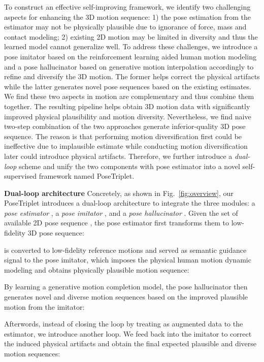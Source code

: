 \documentclass[10pt,twocolumn,letterpaper]{article}
\newcommand{\nameofmethod}{PoseTriplet}
\begin{document}
To construct an effective self-improving framework, we identify two challenging aspects for enhancing the 3D motion sequence: 1) the pose estimation from the estimator may not be physically plausible due to ignorance of force, mass and contact modeling; 2) existing 2D motion  may be limited in diversity and thus the learned model cannot generalize well. 
To address these challenges, we introduce a pose imitator based on the reinforcement learning aided human motion modeling and a pose hallucinator based on generative motion interpolation accordingly to refine and diversify the 3D motion. The former helps correct the physical artifacts while the latter generates novel pose sequences based on the existing estimates. 
We find these two aspects in motion are complementary and thus combine them together.
The resulting pipeline helps obtain 3D motion data  with significantly improved physical plausibility and motion diversity.
Nevertheless, we find naive two-step combination of the two approaches generate  inferior-quality 3D pose sequence. 
The reason is that performing motion diversification first could be ineffective due to implausible estimate while conducting motion diversification later could introduce physical artifacts.
Therefore, we further introduce a \textit{dual-loop} scheme and unify the two components with pose estimator into a novel self-supervised framework named \nameofmethod{}.


\noindent \textbf{Dual-loop architecture}
Concretely, as shown in Fig.~\ref{fig:overview}, our \nameofmethod{} introduces a dual-loop architecture to integrate the three modules: a \textit{pose estimator} , a \textit{pose imitator} , and a \textit{pose hallucinator} .
Given the set of available 2D pose sequence ,
the pose estimator first transforms them to low-fidelity 3D pose sequence:

 is converted to low-fidelity reference motions and served as semantic guidance signal to the pose imitator, which imposes the physical human motion dynamic modeling and obtains physically plausible motion sequence:

By learning a generative motion completion model, the pose hallucinator then generates novel and diverse motion sequences  based on the improved plausible motion from the imitator:

Afterwords, instead of closing the loop by treating  as augmented data to the estimator, we introduce another loop.
We feed  back into the imitator to correct the induced physical artifacts and obtain the final expected plausible and diverse motion sequences:
\end{document}
